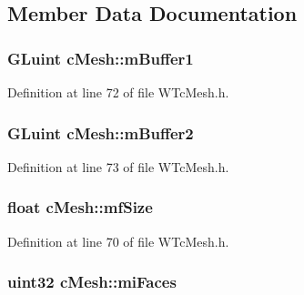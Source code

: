 \subsection{Member Data Documentation}
\hypertarget{classc_mesh_a5de7b00f4575c394fe1fbcb0f15ef020}{
\subsubsection[{mBuffer1}]{\setlength{\rightskip}{0pt plus 5cm}GLuint {\bf cMesh::mBuffer1}}}
\label{classc_mesh_a5de7b00f4575c394fe1fbcb0f15ef020}


Definition at line 72 of file WTcMesh.h.

\hypertarget{classc_mesh_aa24b95dee85706686fc1d46d34bc88ae}{
\subsubsection[{mBuffer2}]{\setlength{\rightskip}{0pt plus 5cm}GLuint {\bf cMesh::mBuffer2}}}
\label{classc_mesh_aa24b95dee85706686fc1d46d34bc88ae}


Definition at line 73 of file WTcMesh.h.

\hypertarget{classc_mesh_a15202141e9b35f71708fc0f35182f261}{
\subsubsection[{mfSize}]{\setlength{\rightskip}{0pt plus 5cm}float {\bf cMesh::mfSize}}}
\label{classc_mesh_a15202141e9b35f71708fc0f35182f261}


Definition at line 70 of file WTcMesh.h.

\hypertarget{classc_mesh_ab740f62d6b44cc814481197be7669a3b}{
\subsubsection[{miFaces}]{\setlength{\rightskip}{0pt plus 5cm}uint32 {\bf cMesh::miFaces}}}
\label{classc_mesh_ab740f62d6b44cc814481197be7669a3b}


